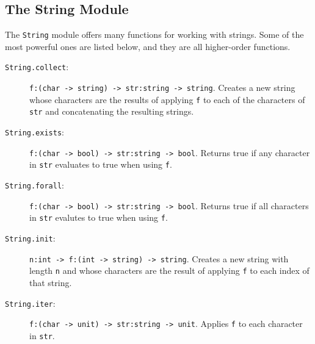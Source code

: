 \subsection{The String Module}
The \lstinline{String} module offers many functions for working with strings. Some of the most powerful ones are listed below, and they are all higher-order functions.
\begin{description}
\item[\texttt{String.collect}:] \lstinline{f:(char -> string) -> str:string -> string}. Creates a new string whose characters are the results of applying \lstinline{f} to each of the characters of \lstinline{str} and concatenating the resulting strings.
 \item[\texttt{String.exists}:] \lstinline{f:(char -> bool) -> str:string -> bool}. Returns true if any character in \lstinline{str} evaluates to true when using \lstinline{f}.
 \item[\texttt{String.forall}:] \lstinline{f:(char -> bool) -> str:string -> bool}. Returns true if all characters in \lstinline{str} evalutes to true when using \lstinline{f}.
\item[\texttt{String.init}:] \lstinline{n:int -> f:(int -> string) -> string}. Creates a new string with length \lstinline{n} and whose characters are the result of applying \lstinline{f} to each index of that string.
\item[\texttt{String.iter}:] \lstinline{f:(char -> unit) -> str:string -> unit}. Applies \lstinline{f} to each character in \lstinline{str}.

\end{description}
